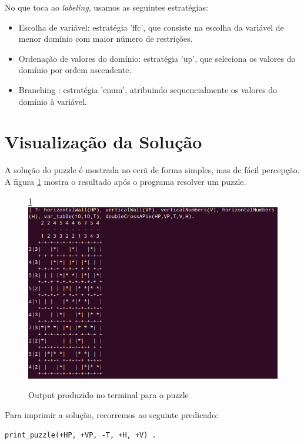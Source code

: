 \documentclass[runningheads,a4paper]{llncs}
\begin{document}
No que toca ao \textit{labeling}, usamos as seguintes estratégias:

\begin{itemize}
\item Escolha de variável:  estratégia 'ffc', que consiste na escolha da variável de menor domínio com maior número de restrições.
\item Ordenação de valores do domínio: estratégia 'up', que seleciona os valores do domínio por ordem ascendente.
\item Branching : estratégia 'enum', atribuindo sequencialmente os valores do domínio à variável.
\end{itemize}

\section{Visualização da Solução}

A solução do puzzle é mostrada no ecrã de forma simples, mas de fácil percepção. A figura \ref{fig:outputboard} mostra o resultado após o programa resolver um puzzle.

\begin{figure}[h]
\ref{fig:outputboard}
\centering
\includegraphics[scale=0.5]{res/output.png}
\caption{Output produzido no terminal para o puzzle}
\label{fig:outputboard}
\end{figure}

Para imprimir a solução, recorremos ao seguinte predicado:

\begin{lstlisting}
print_puzzle(+HP, +VP, -T, +H, +V) .
\end{lstlisting}
\end{document}
